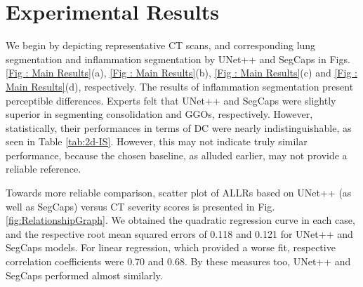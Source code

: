 \section{Experimental Results}

We begin by depicting representative CT scans, and corresponding lung segmentation and inflammation segmentation by UNet++ and SegCaps in Figs. \ref{Fig : Main Results}(a), \ref{Fig : Main Results}(b), \ref{Fig : Main Results}(c) and \ref{Fig : Main Results}(d), respectively. The results of inflammation segmentation present perceptible differences. Experts felt that UNet++ and SegCaps were slightly superior in segmenting consolidation and GGOs, respectively. However, statistically, their performances in terms of DC were nearly indistinguishable, as seen in Table \ref{tab:2d-IS}. However, this may not indicate truly similar performance, because the chosen baseline, as alluded earlier, may not provide a reliable reference.









Towards more reliable comparison, scatter plot of ALLRs based on UNet++ (as well as SegCaps) versus CT severity scores is presented in Fig. \ref{fig:RelationshipGraph}. We obtained the quadratic regression curve in each case, and the respective root mean squared errors of 0.118 and 0.121 for UNet++ and SegCaps models. For linear regression, which provided a worse fit, respective correlation coefficients were 0.70 and 0.68. By these measures too, UNet++ and SegCaps performed almost similarly.


